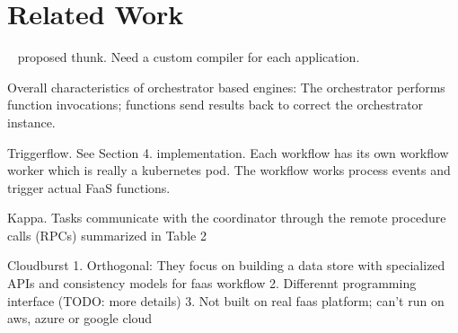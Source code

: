 \section{Related Work}\label{sec:related}

\gg~\cite{gg-atc} proposed thunk. Need a custom compiler for each application.


Overall characteristics of orchestrator based engines: The orchestrator
performs function invocations; functions send results back to correct the
orchestrator instance.

Triggerflow.
See Section 4. implementation. Each workflow has its own workflow worker which is really a kubernetes pod. The workflow works process events and trigger actual FaaS functions.

Kappa.
Tasks communicate with the coordinator through
the remote procedure calls (RPCs) summarized in Table 2

Cloudburst
1. Orthogonal: They focus on building a data store with specialized APIs and consistency models for faas workflow
2. Differennt programming interface (TODO: more details)
3. Not built on real faas platform; can't run on aws, azure or google cloud






 




